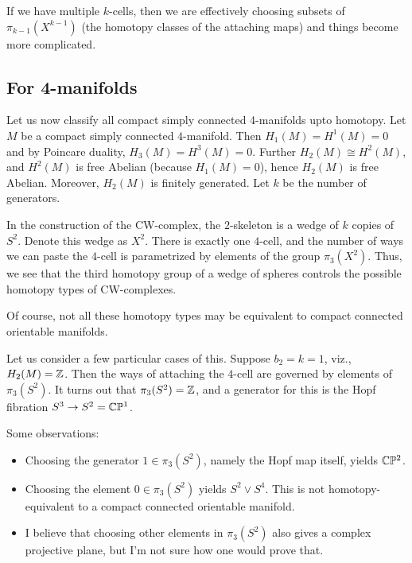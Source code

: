 \documentclass[a4paper]{amsart}
\begin{document}
If we have multiple $k$-cells, then we are effectively choosing
subsets of $\pi_{k-1}(X^{k-1})$ (the homotopy classes of the attaching
maps) and things become more complicated.

\subsection{For 4-manifolds}

Let us now classify all compact simply connected 4-manifolds upto
homotopy.  Let $M$ be a compact simply connected $4$-manifold. Then
$H_1(M) = H^1(M) = 0$ and by Poincare duality, $H_3(M) = H^3(M) = 0$.
Further $H_2(M) \cong H^2(M)$, and $H^2(M)$ is free Abelian (because
$H_1(M) = 0$), hence $H_2(M)$ is free Abelian. Moreover, $H_2(M)$ is
finitely generated. Let $k$ be the number of generators.

In the construction of the CW-complex, the $2$-skeleton is a wedge of
$k$ copies of $S^2$. Denote this wedge as $X^2$. There is exactly one
$4$-cell, and the number of ways we can paste the $4$-cell is
parametrized by elements of the group $\pi_3(X^2)$. Thus, we see that
the third homotopy group of a wedge of spheres controls the possible
homotopy types of CW-complexes.

Of course, not all these homotopy types may be equivalent to compact connected
orientable manifolds.

Let us consider a few particular cases of this. Suppose $b_2 = k = 1$,
viz., $H_2(M) = \mathbb{Z}$. Then the ways of attaching the $4$-cell are
governed by elements of $\pi_3(S^2)$. It turns out that $\pi_3(S^2) =
\mathbb{Z}$, and a generator for this is the Hopf fibration $S^3 \to S^2 =
\mathbb{C}\mathbb{P}^1$.

Some observations:

\begin{itemize}

\item Choosing the generator $1 \in \pi_3(S^2)$, namely the Hopf map itself,
  yields $\mathbb{C}\mathbb{P}^2$.

\item Choosing the element $0 \in \pi_3(S^2)$ yields $S^2 \vee
  S^4$. This is not homotopy-equivalent to a compact connected
  orientable manifold.

\item I believe that choosing other elements in $\pi_3(S^2)$ also
  gives a complex projective plane, but I'm not sure how one would
  prove that.

\end{itemize}
\end{document}

